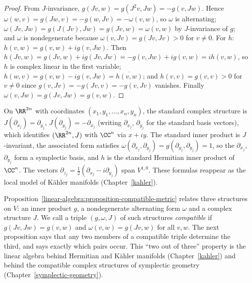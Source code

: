 \begin{proof}
From $J$-invariance, $g(Jv, w) = g(J^2 v, Jw) = -g(v, Jw)$. Hence
$\omega(w, v) = g(Jw, v) = -g(w, Jv) = -\omega(v, w)$, so $\omega$ is alternating;
$\omega(Jv, Jw) = g(J(Jv), Jw) = g(Jv, w) = \omega(v, w)$ by $J$-invariance of $g$; and $\omega$ is
nondegenerate because $\omega(v, Jv) = g(Jv, Jv) > 0$ for $v \neq 0$. For $h$:
$h(v, w) = g(v, w) + i g(v, Jw)$. Then $h(Jv, w) = g(Jv, w) + ig(Jv, Jw) = -g(v, Jw) + ig(v, w) = ih(v, w)$, so $h$ is
complex linear in the first variable; $h(w, v) = g(v, w) - ig(v, Jw) = \overline{h(v, w)}$; and
$h(v, v) = g(v, v) > 0$ for $v \neq 0$ since $g(v, Jv) = -g(Jv, v) = -g(v, Jv)$ vanishes. Finally
$\omega(v, Jw) = g(Jv, Jw) = g(v, w)$.
\end{proof}

\begin{example}\label{linear-algebra:example-standard-structure}
On $\RR^{2n}$ with coordinates $(x_1, y_1, \ldots, x_n, y_n)$, the standard complex structure is
$J(\partial_{x_j}) = \partial_{y_j}$, $J(\partial_{y_j}) = -\partial_{x_j}$ (writing $\partial_{x_j}$, $\partial_{y_j}$ for the standard basis vectors),
which identifies $(\RR^{2n}, J)$ with $\CC^n$ via $x + iy$. The standard inner product is $J$-invariant, the
associated form satisfies $\omega(\partial_{x_j}, \partial_{y_j}) = g(\partial_{y_j}, \partial_{y_j}) = 1$, so the $\partial_{x_j}$, $\partial_{y_j}$
form a symplectic basis, and $h$ is the standard Hermitian inner product of $\CC^n$. The vectors
$\partial_{z_j} = \frac12(\partial_{x_j} - i\partial_{y_j})$ span $V^{1,0}$. These formulas reappear as the local model of Kähler
manifolds (Chapter~\ref{kahler}).
\end{example}

Proposition~\ref{linear-algebra:proposition-compatible-metric} relates three structures on $V$: an inner product $g$, a nondegenerate alternating form $\omega$ and a complex structure $J$. We call a triple
$(g, \omega, J)$ of such structures \emph{compatible} if $g(Jv, Jw) = g(v, w)$ and $\omega(v, w) = g(Jv, w)$ for all $v, w$. The next proposition says that any two members of a compatible triple
determine the third, and says exactly which pairs occur. This ``two out of three'' property is the linear algebra behind Hermitian and K\"ahler manifolds (Chapter~\ref{kahler}) and behind the
compatible complex structures of symplectic geometry (Chapter~\ref{symplectic-geometry}).


